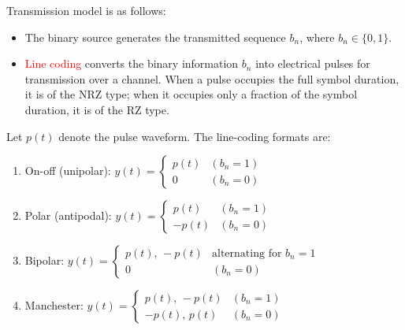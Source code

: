 \documentclass[a4paper,11pt]{article}
\begin{document}
\tableofcontents
\clearpage
{}

Transmission model is as follows:

\begin{itemize}
    \item The binary source generates the transmitted sequence $b_n$, where $b_n \in \{0,1\}$.
    \item \textcolor{red}{Line coding} converts the binary information $b_n$ into electrical pulses for transmission over a channel. When a pulse occupies the full symbol duration, it is of the NRZ type; when it occupies only a fraction of the symbol duration, it is of the RZ type.
\end{itemize}


Let $p(t)$ denote the pulse waveform. The line-coding formats are:
\begin{enumerate}
    \setlength{\itemsep}{8pt}
    \item On-off (unipolar): \quad $\displaystyle y(t) = \begin{cases}
                  p(t) & (b_n = 1) \\
                  0    & (b_n = 0)
              \end{cases}$
    \item Polar (antipodal): \quad $\displaystyle y(t) = \begin{cases}
                  p(t)  & (b_n = 1) \\
                  -p(t) & (b_n = 0)
              \end{cases}$
    \item Bipolar: \quad $\displaystyle y(t) = \begin{cases}
                  p(t),\,-p(t) & \text{alternating for } b_n = 1 \\
                  0            & (b_n = 0)
              \end{cases}$
    \item Manchester: \quad $\displaystyle y(t) = \begin{cases}
                  p(t),\,-p(t) & (b_n = 1) \\
                  -p(t),\,p(t) & (b_n = 0)
              \end{cases}$
\end{enumerate}
\end{document}
